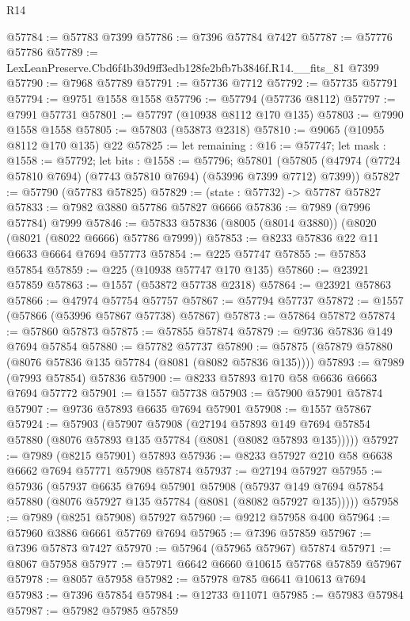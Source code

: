 \begin{lexlean}{R14}
\begin{coremodule}
@57784 := @57783 @7399
@57786 := @7396 @57784 @7427
@57787 := @57776 @57786
@57789 := LexLeanPreserve.Cbd6f4b39d9ff3edb128fe2bfb7b3846f.R14.__fits_81 @7399
@57790 := @7968 @57789
@57791 := @57736 @7712
@57792 := @57735 @57791
@57794 := @9751 @1558 @1558
@57796 := @57794 (@57736 @8112)
@57797 := @7991 @57731
@57801 := @57797 (@10938 @8112 @170 @135)
@57803 := @7990 @1558 @1558
@57805 := @57803 (@53873 @2318)
@57810 := @9065 (@10955 @8112 @170 @135) @22
@57825 := let remaining : @16 := @57747;
  let mask : @1558 := @57792;
  let bits : @1558 := @57796;
  @57801 (@57805 (@47974 (@7724 @57810 @7694) (@7743 @57810 @7694) (@53996 @7399 @7712) @7399))
@57827 := @57790 (@57783 @57825)
@57829 := (state : @57732) -> @57787 @57827
@57833 := @7982 @3880 @57786 @57827 @6666
@57836 := @7989 (@7996 @57784) @7999
@57846 := @57833 @57836 (@8005 (@8014 @3880)) (@8020 (@8021 (@8022 @6666) @57786 @7999))
@57853 := @8233 @57836 @22 @11 @6633 @6664 @7694 @57773
@57854 := @225 @57747
@57855 := @57853 @57854
@57859 := @225 (@10938 @57747 @170 @135)
@57860 := @23921 @57859
@57863 := @1557 (@53872 @57738 @2318)
@57864 := @23921 @57863
@57866 := @47974 @57754 @57757
@57867 := @57794 @57737
@57872 := @1557 (@57866 (@53996 @57867 @57738) @57867)
@57873 := @57864 @57872
@57874 := @57860 @57873
@57875 := @57855 @57874
@57879 := @9736 @57836 @149 @7694 @57854
@57880 := @57782 @57737
@57890 := @57875 (@57879 @57880 (@8076 @57836 @135 @57784 (@8081 (@8082 @57836 @135))))
@57893 := @7989 (@7993 @57854) @57836
@57900 := @8233 @57893 @170 @58 @6636 @6663 @7694 @57772
@57901 := @1557 @57738
@57903 := @57900 @57901 @57874
@57907 := @9736 @57893 @6635 @7694 @57901
@57908 := @1557 @57867
@57924 := @57903
    (@57907
      @57908
      (@27194
        @57893
        @149
        @7694
        @57854
        @57880
        (@8076 @57893 @135 @57784 (@8081 (@8082 @57893 @135)))))
@57927 := @7989 (@8215 @57901) @57893
@57936 := @8233 @57927 @210 @58 @6638 @6662 @7694 @57771 @57908 @57874
@57937 := @27194 @57927
@57955 := @57936
    (@57937
      @6635
      @7694
      @57901
      @57908
      (@57937 @149 @7694 @57854 @57880 (@8076 @57927 @135 @57784 (@8081 (@8082 @57927 @135)))))
@57958 := @7989 (@8251 @57908) @57927
@57960 := @9212 @57958 @400
@57964 := @57960 @3886 @6661 @57769 @7694
@57965 := @7396 @57859
@57967 := @7396 @57873 @7427
@57970 := @57964 (@57965 @57967) @57874
@57971 := @8067 @57958
@57977 := @57971 @6642 @6660 @10615 @57768 @57859 @57967
@57978 := @8057 @57958
@57982 := @57978 @785 @6641 @10613 @7694
@57983 := @7396 @57854
@57984 := @12733 @11071
@57985 := @57983 @57984
@57987 := @57982 @57985 @57859

\end{coremodule}
\end{lexlean}
